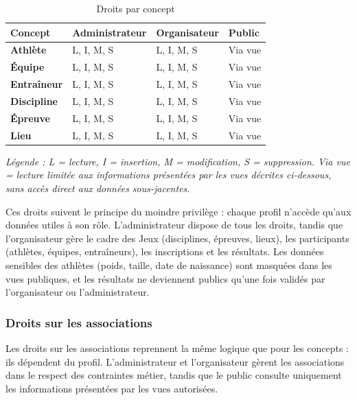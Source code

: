 \begin{table}[H]
  \centering
  \footnotesize
  \renewcommand{\arraystretch}{1.3}
  \begin{tabular}{|>{\raggedright\arraybackslash}p{3.1cm}|
                  >{\centering\arraybackslash}p{3.0cm}|
                  >{\centering\arraybackslash}p{4.4cm}|
                  >{\centering\arraybackslash}p{3.0cm}|}
    \hline
    \rowcolor{gray!25}
    {Concept} & {Administrateur} & {Organisateur} & {Public} \\
    \hline
    \textbf{Athlète} & L, I, M, S & L, I, M, S & Via vue \\
    \hline
    \textbf{Équipe} & L, I, M, S & L, I, M, S & Via vue \\
    \hline
    \textbf{Entraîneur} & L, I, M, S & L, I, M, S & Via vue \\
    \hline
    \textbf{Discipline} & L, I, M, S & L, I, M, S & Via vue \\
    \hline
    \textbf{Épreuve} & L, I, M, S & L, I, M, S & Via vue \\
    \hline
    \textbf{Lieu} & L, I, M, S & L, I, M, S & Via vue \\
    \hline
  \end{tabular}
  \caption{Droits par concept}
  \label{tab:droits-concepts}
  \vspace{0.5em}
  {\footnotesize\textit{Légende : L = lecture, I = insertion, M = modification, S = suppression. Via vue = lecture limitée aux informations présentées par les vues décrites ci-dessous, sans accès direct aux données sous-jacentes.}}
\end{table}

Ces droits suivent le principe du moindre privilège : chaque profil n'accède qu'aux données utiles à son rôle. L'administrateur dispose de tous les droits, tandis que l'organisateur gère le cadre des Jeux (disciplines, épreuves, lieux), les participants (athlètes, équipes, entraîneurs), les inscriptions et les résultats. Les données sensibles des athlètes (poids, taille, date de naissance) sont masquées dans les vues publiques, et les résultats ne deviennent publics qu'une fois validés par l'organisateur ou l'administrateur.

\clearpage
\subsubsection{Droits sur les associations}

Les droits sur les associations reprennent la même logique que pour les concepts : ils dépendent du profil. L'administrateur et l'organisateur gèrent les associations dans le respect des contraintes métier, tandis que le public consulte uniquement les informations présentées par les vues autorisées.


